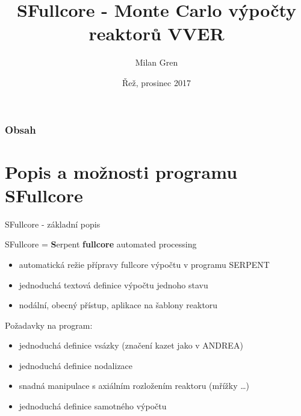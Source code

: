 \documentclass{beamer}
\title{SFullcore - Monte Carlo výpočty reaktorů VVER}
\author{Milan Gren}
\date{Řež, prosinec 2017}
\institute[ÚJV Řež]
{ÚJV Řež}
\begin{document}
\begin{frame}[plain]
  \titlepage
\end{frame}


\begin{frame}
\frametitle{Obsah}
  \tableofcontents
\end{frame}

\section{Popis a možnosti programu SFullcore}

\begin{frame}{SFullcore - základní popis}
  
\begin{center}
SFullcore = \textbf{S}erpent \textbf{fullcore} automated processing
\end{center}

\begin{block}{}\small
\begin{itemize}\footnotesize
\item automatická režie přípravy fullcore výpočtu v programu SERPENT
\item jednoduchá textová definice výpočtu jednoho stavu
\item nodální, obecný přístup, aplikace na šablony reaktoru
\end{itemize}
\end{block}
\begin{block}{}\small
Požadavky na program:
\begin{itemize}\footnotesize
\item jednoduchá definice vsázky (značení kazet jako v ANDREA)
\item jednoduchá definice nodalizace 
\item snadná manipulace s axiálním rozložením reaktoru (mřížky \dots)
\item jednoduchá definice samotného výpočtu
\end{itemize}
\end{block}
\end{frame}
\end{document}
